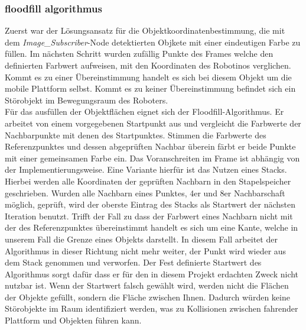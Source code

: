 	\subsubsection{floodfill algorithmus}
	Zuerst war der Lösungsansatz für die Objektkoordinatenbestimmung, die mit dem \textit{Image\_Subscriber}-Node detektierten Objkete mit einer eindeutigen Farbe zu füllen. Im nächsten Schritt wurden zufällig Punkte des Frames welche den definierten Farbwert aufweisen, mit den Koordinaten des Robotinos verglichen. Kommt es zu einer Übereinstimmung handelt es sich bei diesem Objekt um die mobile Plattform selbst. Kommt es zu keiner Übereinstimmung befindet sich ein Störobjekt im Bewegungsraum des Roboters.\\ Für das ausfüllen der Objektflächen eignet sich der Floodfill-Algorithmus. Er arbeitet von einem vorgegebenen Startpunkt aus und vergleicht die Farbwerte der Nachbarpunkte mit denen des Startpunktes. Stimmen die Farbwerte des Referenzpunktes und dessen abgeprüften Nachbar überein färbt er beide Punkte mit einer gemeinsamen Farbe ein. Das Voranschreiten im Frame ist abhängig von der Implementierungsweise. Eine Variante hierfür ist das Nutzen eines Stacks. Hierbei werden alle Koordinaten der geprüften Nachbarn in den Stapelspeicher geschrieben. Wurden alle Nachbarn eines Punktes, 4er und 8er Nachbarschaft möglich, geprüft, wird der oberste Eintrag des Stacks als Startwert der nächsten Iteration benutzt. Trifft der Fall zu dass der Farbwert eines Nachbarn nicht mit der des Referenzpunktes übereinstimmt handelt es sich um eine Kante, welche in unserem Fall die Grenze eines Objekts darstellt. In diesem Fall arbeitet der Algorithmus in dieser Richtung nicht mehr weiter, der Punkt wird wieder aus dem Stack genommen und verworfen. Der Fest definierte Startwert des Algorithmus sorgt dafür dass er für den in diesem Projekt erdachten Zweck nicht nutzbar ist. Wenn der Startwert falsch gewählt wird, werden nicht die Flächen der Objekte gefüllt, sondern die Fläche zwischen Ihnen. Dadurch würden keine Störobjekte im Raum identifiziert werden, was zu Kollisionen zwischen fahrender Plattform und Objekten führen kann.\cite{lode-floodfill}
	
